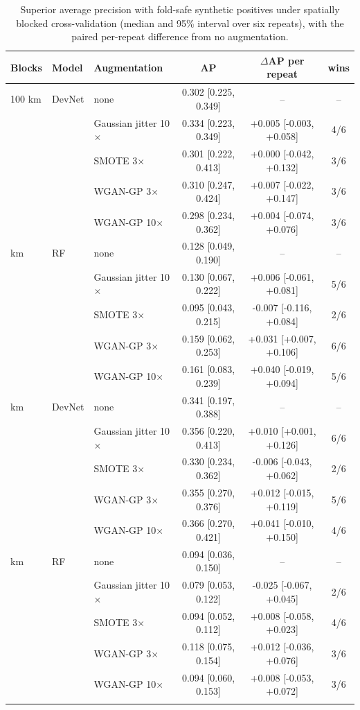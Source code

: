 \documentclass[pdflatex,sn-apa]{sn-jnl}
\begin{document}
\begin{appendices}
\begin{table}[!h]
\caption{Superior average precision with fold-safe synthetic positives under spatially blocked cross-validation (median and 95\% interval over six repeats), with the paired per-repeat difference from no augmentation.}\label{tab:aug-spatial}
\footnotesize
\begin{tabular*}{\textwidth}{@{\extracolsep\fill}lllccc}
\toprule
Blocks & Model & Augmentation & AP & $\Delta$AP per repeat & wins \\
\midrule
100 km & DevNet & none & 0.302 [0.225, 0.349] & -- & -- \\
 &  & Gaussian jitter 10$\times$ & 0.334 [0.223, 0.349] & +0.005 [-0.003, +0.058] & 4/6 \\
 &  & SMOTE 3$\times$ & 0.301 [0.222, 0.413] & +0.000 [-0.042, +0.132] & 3/6 \\
 &  & WGAN-GP 3$\times$ & 0.310 [0.247, 0.424] & +0.007 [-0.022, +0.147] & 3/6 \\
 &  & WGAN-GP 10$\times$ & 0.298 [0.234, 0.362] & +0.004 [-0.074, +0.076] & 3/6 \\
\addlinespace
100 km & RF & none & 0.128 [0.049, 0.190] & -- & -- \\
 &  & Gaussian jitter 10$\times$ & 0.130 [0.067, 0.222] & +0.006 [-0.061, +0.081] & 5/6 \\
 &  & SMOTE 3$\times$ & 0.095 [0.043, 0.215] & -0.007 [-0.116, +0.084] & 2/6 \\
 &  & WGAN-GP 3$\times$ & 0.159 [0.062, 0.253] & +0.031 [+0.007, +0.106] & 6/6 \\
 &  & WGAN-GP 10$\times$ & 0.161 [0.083, 0.239] & +0.040 [-0.019, +0.094] & 5/6 \\
\addlinespace
200 km & DevNet & none & 0.341 [0.197, 0.388] & -- & -- \\
 &  & Gaussian jitter 10$\times$ & 0.356 [0.220, 0.413] & +0.010 [+0.001, +0.126] & 6/6 \\
 &  & SMOTE 3$\times$ & 0.330 [0.234, 0.362] & -0.006 [-0.043, +0.062] & 2/6 \\
 &  & WGAN-GP 3$\times$ & 0.355 [0.270, 0.376] & +0.012 [-0.015, +0.119] & 5/6 \\
 &  & WGAN-GP 10$\times$ & 0.366 [0.270, 0.421] & +0.041 [-0.010, +0.150] & 4/6 \\
\addlinespace
200 km & RF & none & 0.094 [0.036, 0.150] & -- & -- \\
 &  & Gaussian jitter 10$\times$ & 0.079 [0.053, 0.122] & -0.025 [-0.067, +0.045] & 2/6 \\
 &  & SMOTE 3$\times$ & 0.094 [0.052, 0.112] & +0.008 [-0.058, +0.023] & 4/6 \\
 &  & WGAN-GP 3$\times$ & 0.118 [0.075, 0.154] & +0.012 [-0.036, +0.076] & 3/6 \\
 &  & WGAN-GP 10$\times$ & 0.094 [0.060, 0.153] & +0.008 [-0.053, +0.072] & 3/6 \\
\botrule
\end{tabular*}
\end{table}


\end{appendices}
\end{document}
